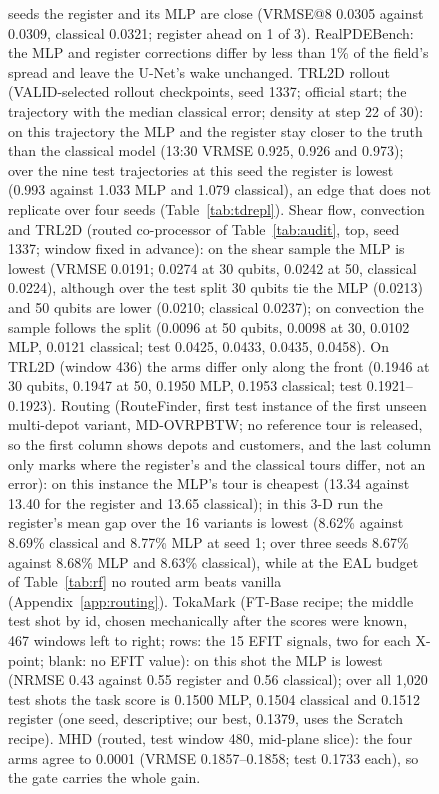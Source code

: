 \documentclass{article}
\begin{document}
\begin{figure}[t]
{seeds the register and its MLP are close (VRMSE@8 0.0305 against 0.0309, classical 0.0321; register ahead on 1 of 3). RealPDEBench: the MLP and
register corrections differ by less than 1\% of the field's spread and leave the U-Net's wake unchanged. TRL2D rollout (VALID-selected rollout
checkpoints, seed 1337; official start; the trajectory with the median classical error; density at step 22 of 30): on
this trajectory the MLP and the register stay closer to the truth than the classical model (13:30 VRMSE 0.925, 0.926 and
0.973); over the nine test trajectories at this seed the register is lowest (0.993 against 1.033 MLP and 1.079
classical), an edge that does not replicate over four seeds (Table~\ref{tab:tdrepl}). Shear flow, convection and TRL2D
(routed co-processor of Table~\ref{tab:audit}, top, seed 1337; window fixed in advance): on the shear sample the MLP is
lowest (VRMSE 0.0191; 0.0274 at 30 qubits, 0.0242 at 50, classical 0.0224), although over the test split 30 qubits tie
the MLP (0.0213) and 50 qubits are lower (0.0210; classical 0.0237); on convection the sample follows the split (0.0096
at 50 qubits, 0.0098 at 30, 0.0102 MLP, 0.0121 classical; test 0.0425, 0.0433, 0.0435, 0.0458). On TRL2D (window 436) the arms differ only along the front (0.1946 at 30 qubits, 0.1947 at 50,
0.1950 MLP, 0.1953 classical; test 0.1921--0.1923). Routing (RouteFinder, first test instance of the first unseen multi-depot variant, MD-OVRPBTW; no
reference tour is released, so the first column shows depots and customers, and the last column only marks where the
register's and the classical tours differ, not an error): on this instance the MLP's tour is cheapest (13.34 against
13.40 for the register and 13.65 classical); in this 3-D run the register's mean gap over the 16 variants is lowest (8.62\%
against 8.69\% classical and 8.77\% MLP at seed 1; over three seeds 8.67\% against 8.68\% MLP and 8.63\% classical), while at the EAL budget of
Table~\ref{tab:rf} no routed arm beats vanilla (Appendix~\ref{app:routing}). TokaMark (FT-Base recipe; the middle test shot by id, chosen mechanically after the scores were known, 467
windows left to right; rows: the 15 EFIT signals, two for each X-point; blank: no EFIT value): on this shot the MLP is
lowest (NRMSE 0.43 against 0.55 register and 0.56 classical); over all 1{,}020 test shots the task score is 0.1500 MLP, 0.1504
classical and 0.1512 register (one seed, descriptive; our best, 0.1379, uses the Scratch recipe). MHD (routed, test window 480, mid-plane slice): the four arms
agree to 0.0001 (VRMSE 0.1857--0.1858; test 0.1733 each), so the gate carries the whole gain.}
\label{fig:outputs_all}
\end{figure}
\end{document}

